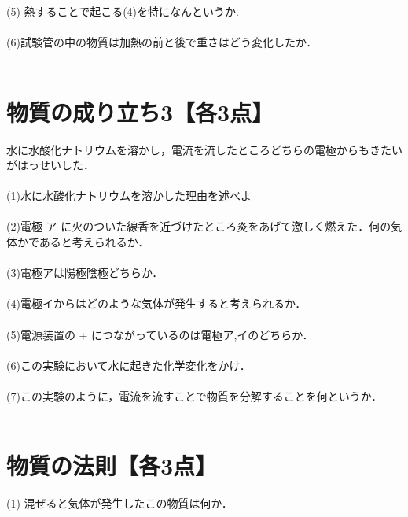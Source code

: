 \documentclass[autodetect-engine,dvi=dvipdfmx,ja=standard,
               a4j,11pt]{bxjsarticle}
\begin{document}
    (5) 熱することで起こる(4)を特になんというか.\\\\

    (6)試験管の中の物質は加熱の前と後で重さはどう変化したか．\\\\
    \clearpage
\section{物質の成り立ち3【各3点】}
\begin{figure}[htb]
        \centering
        \vspace{20pt} %
        \caption{}
\end{figure}
水に水酸化ナトリウムを溶かし，電流を流したところどちらの電極からもきたいがはっせいした．\\\\

    (1)水に水酸化ナトリウムを溶かした理由を述べよ\\\\

    (2)電極 ア に火のついた線香を近づけたところ炎をあげて激しく燃えた．何の気体かであると考えられるか．\\\\

    (3)電極アは陽極陰極どちらか．\\\\

    (4)電極イからはどのような気体が発生すると考えられるか．\\\\

    (5)電源装置の + につながっているのは電極ア,イのどちらか．\\\\

    (6)この実験において水に起きた化学変化をかけ．\\\\

    (7)この実験のように，電流を流すことで物質を分解することを何というか．\\\\
    \clearpage
\section{物質の法則【各3点】}
\begin{figure}[htb]
        \centering
        \vspace{20pt} %
        \caption{}
\end{figure}
    (1) 混ぜると気体が発生したこの物質は何か．\\\\
\end{document}
